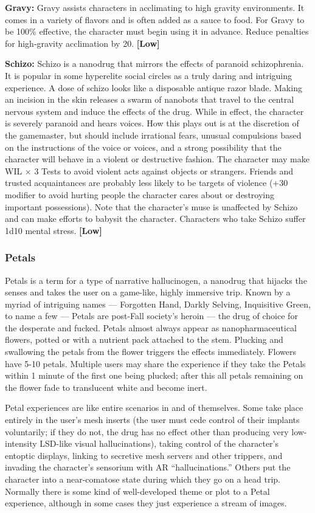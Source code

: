 \textbf{Gravy:} Gravy assists characters in acclimating to high gravity environments. It comes in a variety of flavors and is often added as a sauce to food. For Gravy to be 100\% effective, the character must begin using it in advance. Reduce penalties for high-gravity acclimation by 20. \textbf{[Low]} 

\textbf{Schizo:} Schizo is a nanodrug that mirrors the effects of paranoid schizophrenia. It is popular in some hyperelite social circles as a truly daring and intriguing experience. A dose of schizo looks like a disposable antique razor blade. Making an incision in the skin releases a swarm of nanobots that travel to the central nervous system and induce the effects of the drug. While in effect, the character is severely paranoid and hears voices. How this plays out is at the discretion of the gamemaster, but should include irrational fears, unusual compulsions based on the instructions of the voice or voices, and a strong possibility that the character will behave in a violent or destructive fashion. The character may make WIL $\times$ 3 Tests to avoid violent acts against objects or strangers. Friends and trusted acquaintances are probably less likely to be targets of violence (+30 modifier to avoid hurting people the character cares about or destroying important possessions). Note that the character’s muse is unaffected by Schizo and can make efforts to babysit the character. Characters who take Schizo suffer 1d10 mental stress. \textbf{[Low]} 

\subsubsection{Petals} 

Petals is a term for a type of narrative hallucinogen, a nanodrug that hijacks the senses and takes the user on a game-like, highly immersive trip. Known by a myriad of intriguing names --- Forgotten Hand, Darkly Selving, Inquisitive Green, to name a few --- Petals are post-Fall society’s heroin --- the drug of choice for the desperate and fucked. Petals almost always appear as nanopharmaceutical flowers, potted or with a nutrient pack attached to the stem. Plucking and swallowing the petals from the flower triggers the effects immediately. Flowers have 5-10 petals. Multiple users may share the experience if they take the Petals within 1 minute of the first one being plucked; after this all petals remaining on the flower fade to translucent white and become inert. 

Petal experiences are like entire scenarios in and of themselves. Some take place entirely in the user’s mesh inserts (the user must cede control of their implants voluntarily; if they do not, the drug has no effect other than producing very low-intensity LSD-like visual hallucinations), taking control of the character’s entoptic displays, linking to secretive mesh servers and other trippers, and invading the character’s sensorium with AR ``hallucinations.'' Others put the character into a near-comatose state during which they go on a head trip. Normally there is some kind of well-developed theme or plot to a Petal experience, although in some cases they just experience a stream of images. 


